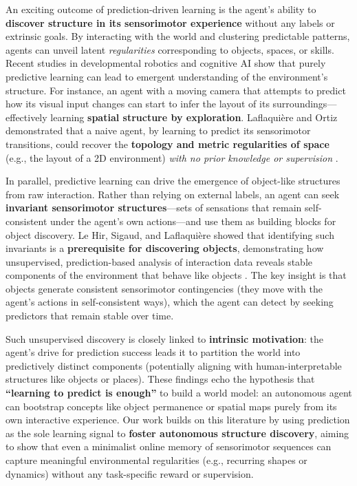 \documentclass[11pt]{article}
\begin{document}
An exciting outcome of prediction-driven learning is the agent’s ability to \textbf{discover structure in its sensorimotor experience} without any labels or extrinsic goals. By interacting with the world and clustering predictable patterns, agents can unveil latent \emph{regularities} corresponding to objects, spaces, or skills. Recent studies in developmental robotics and cognitive AI show that purely predictive learning can lead to emergent understanding of the environment’s structure. For instance, an agent with a moving camera that attempts to predict how its visual input changes can start to infer the layout of its surroundings—effectively learning \textbf{spatial structure by exploration}. Laflaquière and Ortiz demonstrated that a naive agent, by learning to predict its sensorimotor transitions, could recover the \textbf{topology and metric regularities of space} (e.g., the layout of a 2D environment) \emph{with no prior knowledge or supervision} \cite{Laflaquiere2019}.

In parallel, predictive learning can drive the emergence of object-like structures from raw interaction. Rather than relying on external labels, an agent can seek \textbf{invariant sensorimotor structures}—sets of sensations that remain self-consistent under the agent’s own actions—and use them as building blocks for object discovery. Le Hir, Sigaud, and Laflaquière showed that identifying such invariants is a \textbf{prerequisite for discovering objects}, demonstrating how unsupervised, prediction-based analysis of interaction data reveals stable components of the environment that behave like objects \cite{LeHir2018}. The key insight is that objects generate consistent sensorimotor contingencies (they move with the agent’s actions in self-consistent ways), which the agent can detect by seeking predictors that remain stable over time.

Such unsupervised discovery is closely linked to \textbf{intrinsic motivation}: the agent’s drive for prediction success leads it to partition the world into predictively distinct components (potentially aligning with human-interpretable structures like objects or places). These findings echo the hypothesis that \textbf{“learning to predict is enough”} to build a world model: an autonomous agent can bootstrap concepts like object permanence or spatial maps purely from its own interactive experience. Our work builds on this literature by using prediction as the sole learning signal to \textbf{foster autonomous structure discovery}, aiming to show that even a minimalist online memory of sensorimotor sequences can capture meaningful environmental regularities (e.g., recurring shapes or dynamics) without any task-specific reward or supervision.
\end{document}

